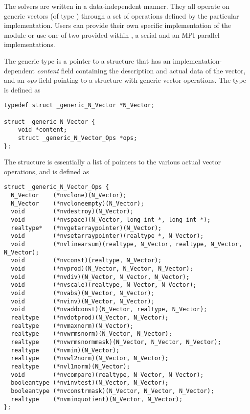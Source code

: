 %
The {\sundials} solvers are written in a data-independent manner. 
They all operate on generic vectors (of type ) through a set of
operations defined by the particular {\nvector} implementation.
Users can provide their own specific implementation of the {\nvector} module
or use one of two provided within {\sundials}, a serial and an MPI parallel
implementations.

The generic  type is a pointer to a structure that has an 
implementation-dependent {\em content} field containing the 
description and actual data of the vector, and an {\em ops} field 
pointing to a structure with generic vector operations.
The type  is defined as
\begin{verbatim}
typedef struct _generic_N_Vector *N_Vector;

struct _generic_N_Vector {
    void *content;
    struct _generic_N_Vector_Ops *ops;
};
\end{verbatim}
The  structure is essentially a list of pointers to
the various actual vector operations, and is defined as
\begin{verbatim}
struct _generic_N_Vector_Ops {
  N_Vector    (*nvclone)(N_Vector);
  N_Vector    (*nvcloneempty)(N_Vector);
  void        (*nvdestroy)(N_Vector);
  void        (*nvspace)(N_Vector, long int *, long int *);
  realtype*   (*nvgetarraypointer)(N_Vector);
  void        (*nvsetarraypointer)(realtype *, N_Vector);
  void        (*nvlinearsum)(realtype, N_Vector, realtype, N_Vector, N_Vector); 
  void        (*nvconst)(realtype, N_Vector);
  void        (*nvprod)(N_Vector, N_Vector, N_Vector);
  void        (*nvdiv)(N_Vector, N_Vector, N_Vector);
  void        (*nvscale)(realtype, N_Vector, N_Vector);
  void        (*nvabs)(N_Vector, N_Vector);
  void        (*nvinv)(N_Vector, N_Vector);
  void        (*nvaddconst)(N_Vector, realtype, N_Vector);
  realtype    (*nvdotprod)(N_Vector, N_Vector);
  realtype    (*nvmaxnorm)(N_Vector);
  realtype    (*nvwrmsnorm)(N_Vector, N_Vector);
  realtype    (*nvwrmsnormmask)(N_Vector, N_Vector, N_Vector);
  realtype    (*nvmin)(N_Vector);
  realtype    (*nvwl2norm)(N_Vector, N_Vector);
  realtype    (*nvl1norm)(N_Vector);
  void        (*nvcompare)(realtype, N_Vector, N_Vector);
  booleantype (*nvinvtest)(N_Vector, N_Vector);
  booleantype (*nvconstrmask)(N_Vector, N_Vector, N_Vector);
  realtype    (*nvminquotient)(N_Vector, N_Vector);
};
\end{verbatim}




